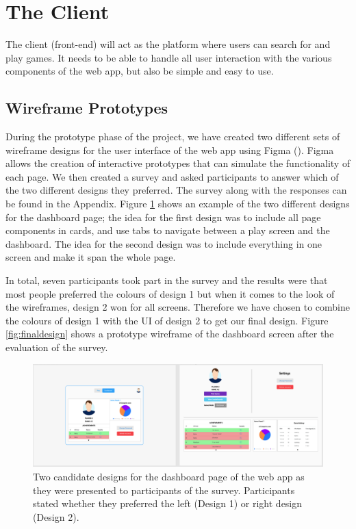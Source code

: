 \documentclass{l4proj}
\begin{document}
\section{The Client}
The client (front-end) will act as the platform where users can search for and play games. It needs to be able to handle all user interaction with the various components of the web app, but also be simple and easy to use.

\subsection{Wireframe Prototypes}
During the prototype phase of the project, we have created two different sets of wireframe designs for the user interface of the web app using Figma (\cite{figma}). Figma allows the creation of interactive prototypes that can simulate the functionality of each page. We then created a survey and asked participants to answer which of the two different designs they preferred. The survey along with the responses can be found in the Appendix. Figure \ref{fig:wireframe} shows an example of the two different designs for the dashboard page; the idea for the first design was to include all page components in cards, and use tabs to navigate between a play screen and the dashboard. The idea for the second design was to include everything in one screen and make it span the whole page.

In total, seven participants took part in the survey and the results were that most people preferred the colours of design 1 but when it comes to the look of the wireframes, design 2 won for all screens. Therefore we have chosen to combine the colours of design 1 with the UI of design 2 to get our final design. Figure \ref{fig:finaldesign} shows a prototype wireframe of the dashboard screen after the evaluation of the survey.
\begin{figure}
    \centering
    \includegraphics[width=1\linewidth]{images/Dashboard.png}    

    \caption{Two candidate designs for the dashboard page of the web app as they were presented to participants of the survey. Participants stated whether they preferred the left (Design 1) or right design (Design 2). }

    \label{fig:wireframe} 
\end{figure}
\end{document}
